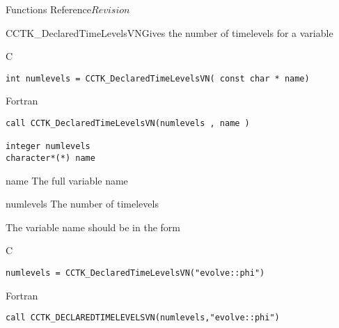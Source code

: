 \begin{cactuspart}{ Functions Reference}{}{$Revision$}
\begin{FunctionDescription}{CCTK\_DeclaredTimeLevelsVN}{Gives the number of timelevels for a variable}
\label{CCTK-DeclaredTimeLevelsVN}
\begin{SynopsisSection}
\begin{Synopsis}{C}
\begin{verbatim}int numlevels = CCTK_DeclaredTimeLevelsVN( const char * name)\end{verbatim}
\end{Synopsis}
\begin{Synopsis}{Fortran}
\begin{verbatim}call CCTK_DeclaredTimeLevelsVN(numlevels , name )

integer numlevels
character*(*) name\end{verbatim}
\end{Synopsis}
\end{SynopsisSection}
\begin{ParameterSection}
\begin{Parameter}{name}
The full variable name
\end{Parameter}
\begin{Parameter}{numlevels}
The number of timelevels
\end{Parameter}
\end{ParameterSection}
\begin{Discussion}
The variable name should be in the form 
\end{Discussion}
\begin{ExampleSection}
\begin{Example}{C}
\begin{verbatim}
numlevels = CCTK_DeclaredTimeLevelsVN("evolve::phi")
\end{verbatim}
\end{Example}
\begin{Example}{Fortran}
\begin{verbatim}
call CCTK_DECLAREDTIMELEVELSVN(numlevels,"evolve::phi")
\end{verbatim}
\end{Example}
\end{ExampleSection}
\end{FunctionDescription}




\end{cactuspart}
